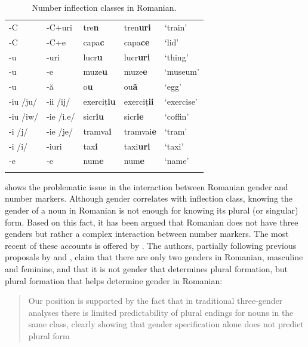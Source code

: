 \begin{table}[!htbp]
\begin{tabular}{lllll}
    \midrule
    -C         & -C+uri     & tre\textbf{n}      & tren\textbf{uri}   & `train'          \\
    -C         & -C+e       & capa\textbf{c}     & capa\textbf{ce}    & `lid'            \\
    -u         & -uri       & lucr\textbf{u}     & lucr\textbf{uri}   & `thing'          \\
    -u         & -e         & muze\textbf{u}     & muze\textbf{e}     & `museum'         \\
    -u         & -ă         & o\textbf{u}        & ou\textbf{ă}       & `egg'            \\
    -iu /ju/   & -ii /ij/   & exerciț\textbf{iu} & exerciț\textbf{ii} & `exercise'       \\
    -iu /iw/   & -ie /i.e/  & sicr\textbf{iu}    & sicr\textbf{ie}    & `coffin'         \\
    -i  /j/    & -ie /je/   & tramva\textbf{i}   & tramvai\textbf{e}  & `tram'           \\
    -i  /i/    & -iuri      & tax\textbf{i}      & taxi\textbf{uri}   & `taxi'           \\
    -e         & -e         & num\textbf{e}      & num\textbf{e}      & `name'           \\
    \lspbottomrule
  \end{tabular}\caption{Number inflection classes in Romanian.}\label{tab:romanian-plural-clases}
\end{table}

 shows the problematic issue in the interaction between Romanian gender and number markers. Although gender correlates with inflection class, knowing the gender of a noun in Romanian is not enough for knowing its plural (or singular) form. Based on this fact, it has been argued that Romanian does not have three genders but rather a complex interaction between number markers. The most recent of these accounts is offered by \textcite{Bateman.2010}. The authors, partially following previous proposals by \textcite{Hall.1965} and \textcite{Farkas.1995}, claim that there are only two genders in Romanian, masculine and feminine, and that it is not gender that determines plural formation, but plural formation that helps determine gender in Romanian:

\nocite{Gerdts.2010} %

\begin{quotation}
Our position is supported by the fact that in traditional three-gender analyses there is limited predictability of plural endings for nouns in the same class, clearly showing that gender specification alone does not predict plural form \autocite[53]{Bateman.2010}
\end{quotation}

